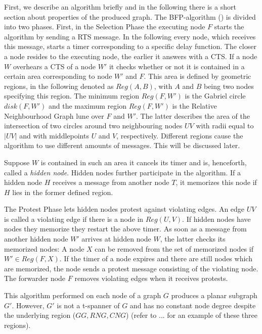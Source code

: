 First, we describe an algorithm briefly and in the following there is a short section about properties of the produced graph.
The BFP-algorithm (\cite{Ruhrup2010}) is divided into two phases.
First, in the Selection Phase the executing node $F $ starts the algorithm by sending a RTS message. 
In the following every node, which receives this message, starts a timer corresponding to a specific delay function.
The closer a node resides to the executing node, the earlier it answers with a CTS. 
If a node $W $ overhears a CTS of a node $W' $ it checks whether or not it is contained in a certain area corresponding to node $W' $ and $F $.
This area is defined by geometric regions, in the following denoted as $Reg(A, B) $, with $A $ and $B $ being two nodes specifying this region.
The minimum region $Reg(F, W') $ is the Gabriel circle $disk(F, W') $ and the maximum region $Reg(F, W') $ is the Relative Neighbourhood Graph lune over $F $ and $W' $.
The latter describes the area of the intersection of two circles around two neighbouring nodes $UV $ with radii equal to $|UV| $ and with middlepoints $U $ and $V $, respectively.
Different regions cause the algorithm to use different amounts of messages.
This will be discussed later.

Suppose $W $ is contained in such an area it cancels its timer and is, henceforth, called a \emph{hidden node}.
Hidden nodes further participate in the algorithm.
If a hidden node $H $ receives a message from another node $T $, it memorizes this node if $H $ lies in the former defined region. 

The Protest Phase lets hidden nodes protest against violating edges.
An edge $UV $ is called a violating edge if there is a node in $Reg(U, V) $.
If hidden nodes have nodes they memorize they restart the above timer.
As soon as a message from another hidden node $W' $ arrives at hidden node $W $, the latter checks its memorized nodes:
A node $X $ can be removed from the set of memorized nodes if $W' \in Reg(F,X) $.
If the timer of a node expires and there are still nodes which are memorized, the node sends a protest message consisting of the violating node.
The forwarder node $F $ removes violating edges when it receives protests.

This algorithm performed on each node of a graph $G $ produces a planar subgraph $G' $.
However, $G' $ is not a t-spanner of $G $ and has no constant node degree despite the underlying region ($GG, RNG, CNG $) (refer to ... for an example of these three regions).

